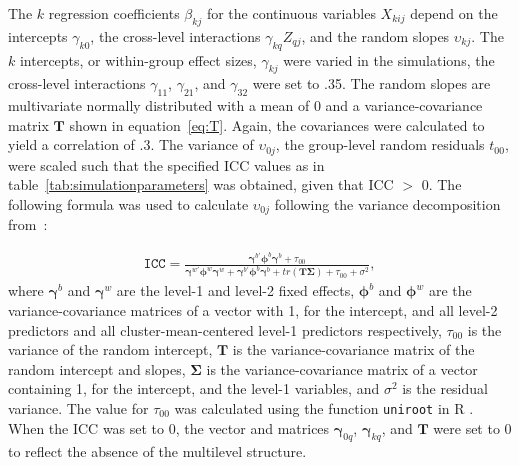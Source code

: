 \documentclass[10pt, a4paper, titlepage]{article}
\begin{document}
The $k$ regression coefficients $\beta_{kj}$ for the continuous variables $X_{kij}$ depend on the intercepts $\gamma_{k0}$, the cross-level interactions $\gamma_{kq}Z_{qj}$, and the random slopes $\upsilon_{kj}$. The $k$ intercepts, or within-group effect sizes, $\gamma_{kj}$ were varied in the simulations, the cross-level interactions $\gamma_{11}$, $\gamma_{21}$, and $\gamma_{32}$ were set to .35. The random slopes are multivariate normally distributed with a mean of 0 and a variance-covariance matrix $\mathbf{T}$ shown in equation~\ref{eq:T}. Again, the covariances were calculated to yield a correlation of .3. The variance of $\upsilon_{0j}$, the group-level random residuals $t_{00}$, were scaled such that the specified ICC values as in table~\ref{tab:simulationparameters} was obtained, given that ICC $>$ 0. The following formula was used to calculate $\upsilon_{0j}$ following the variance decomposition from~\cite{rights2019}:

\begin{align}
\label{eq:variancedecomposition}
\texttt{ICC} = \frac{\boldsymbol{\gamma}^{b'}\boldsymbol{\phi}^{b}\boldsymbol{\gamma}^{b} + \tau_{00}}{\boldsymbol{\gamma}^{w'}\boldsymbol{\phi}^{w}\boldsymbol{\gamma}^{w} + \boldsymbol{\gamma}^{b'}\boldsymbol{\phi}^{b}\boldsymbol{\gamma}^{b} + tr(\mathbf{T}\boldsymbol{\Sigma})+ \tau_{00} + \sigma^{2}},
\end{align} where $\boldsymbol{\gamma}^{b}$ and $\boldsymbol{\gamma}^{w}$ are the level-1 and level-2 fixed effects, $\boldsymbol{\phi}^{b}$ and $\boldsymbol{\phi}^{w}$ are the variance-covariance matrices of a vector with 1, for the intercept, and all level-2 predictors and all cluster-mean-centered level-1 predictors respectively, $\tau_{00}$ is the variance of the random intercept, $\mathbf{T}$ is the variance-covariance matrix of the random intercept and slopes, $\boldsymbol{\Sigma}$ is the variance-covariance matrix of a vector containing 1, for the intercept, and the level-1 variables, and $\sigma^{2}$ is the residual variance. The value for $\tau_{00}$ was calculated using the function \texttt{uniroot} in R \citep{rcoreteam2023}.
When the ICC was set to 0, the vector and matrices $\boldsymbol{\gamma}_{0q}$, $\boldsymbol{\gamma}_{kq}$, and $\mathbf{T}$ were set to 0 to reflect the absence of the multilevel structure. 
\end{document}
